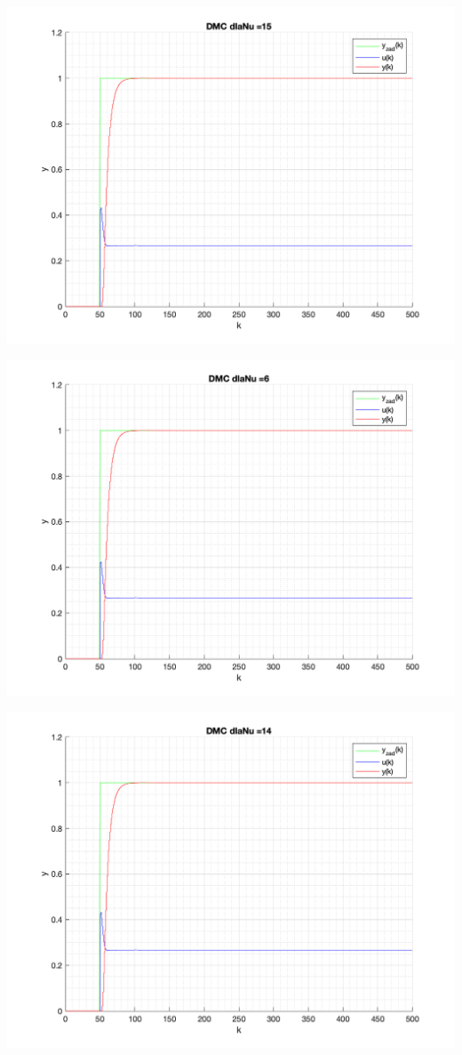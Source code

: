 \documentclass[a4paper, 11pt]{article}
\begin{document}
\begin{enumerate}
 \includegraphics[width=\linewidth]{./ModelsP4_Nu/P4_DMC_Nu_15_png.png} 
 
 \includegraphics[width=\linewidth]{./ModelsP4_Nu/P4_DMC_Nu_6_png.png} 
 
 \includegraphics[width=\linewidth]{./ModelsP4_Nu/P4_DMC_Nu_14_png.png} 
 

\end{enumerate}
\end{document}
